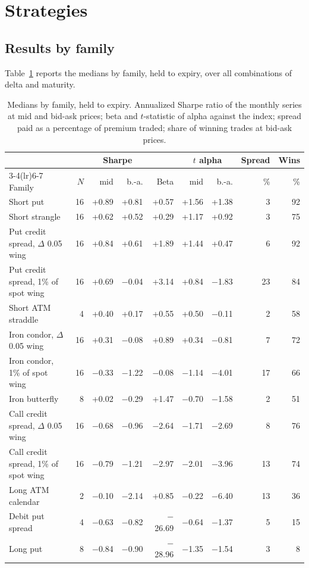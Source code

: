 \documentclass[11pt,a4paper]{article}
\begin{document}
\section{Strategies}\label{sec:strat}

\subsection{Results by family}

Table~\ref{tab:fam} reports the medians by family, held to expiry, over all combinations of delta and maturity.

\begin{table}[ht]\centering\small
\caption{Medians by family, held to expiry. Annualized Sharpe ratio of the monthly series at mid and bid-ask prices; beta and $t$-statistic of alpha against the index; spread paid as a percentage of premium traded; share of winning trades at bid-ask prices.}\label{tab:fam}
\begin{tabular}{lrrrrrrrr}\toprule
 & & \multicolumn{2}{c}{Sharpe} & & \multicolumn{2}{c}{$t$ alpha} & Spread & Wins \\ \cmidrule(lr){3-4}\cmidrule(lr){6-7}
Family & $N$ & mid & b.-a. & Beta & mid & b.-a. & \% & \% \\ \midrule
Short put & 16 & +0.89 & +0.81 & +0.57 & +1.56 & +1.38 & 3 & 92 \\
Short strangle & 16 & +0.62 & +0.52 & +0.29 & +1.17 & +0.92 & 3 & 75 \\
Put credit spread, $\Delta$ 0.05 wing & 16 & +0.84 & +0.61 & +1.89 & +1.44 & +0.47 & 6 & 92 \\
Put credit spread, 1\% of spot wing & 16 & +0.69 & $-$0.04 & +3.14 & +0.84 & $-$1.83 & 23 & 84 \\
Short ATM straddle & 4 & +0.40 & +0.17 & +0.55 & +0.50 & $-$0.11 & 2 & 58 \\
Iron condor, $\Delta$ 0.05 wing & 16 & +0.31 & $-$0.08 & +0.89 & +0.34 & $-$0.81 & 7 & 72 \\
Iron condor, 1\% of spot wing & 16 & $-$0.33 & $-$1.22 & $-$0.08 & $-$1.14 & $-$4.01 & 17 & 66 \\
Iron butterfly & 8 & +0.02 & $-$0.29 & +1.47 & $-$0.70 & $-$1.58 & 2 & 51 \\
Call credit spread, $\Delta$ 0.05 wing & 16 & $-$0.68 & $-$0.96 & $-$2.64 & $-$1.71 & $-$2.69 & 8 & 76 \\
Call credit spread, 1\% of spot wing & 16 & $-$0.79 & $-$1.21 & $-$2.97 & $-$2.01 & $-$3.96 & 13 & 74 \\
Long ATM calendar & 2 & $-$0.10 & $-$2.14 & +0.85 & $-$0.22 & $-$6.40 & 13 & 36 \\
Debit put spread & 4 & $-$0.63 & $-$0.82 & $-$26.69 & $-$0.64 & $-$1.37 & 5 & 15 \\
Long put & 8 & $-$0.84 & $-$0.90 & $-$28.96 & $-$1.35 & $-$1.54 & 3 & 8 \\
\bottomrule\end{tabular}\end{table}
\end{document}
